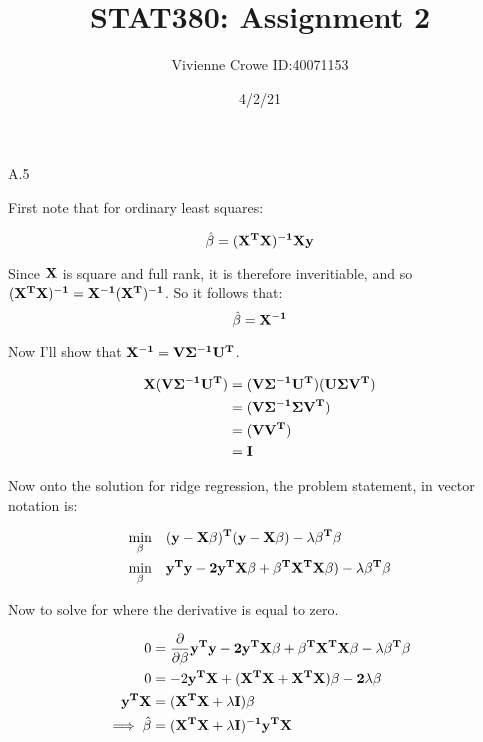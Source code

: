 \documentclass{article}
\begin{document}
    \raggedright
    \title{STAT380: Assignment 2  \\}
    \author{Vivienne Crowe ID:40071153}
    \date{4/2/21}
    
    \maketitle

    \section{}
    \subsection{}

    A.5 

    First note that for ordinary least squares:

    \[\hat{\beta} = (\bf{X}^T\bf{X})^{-1}\bf{X}\bf{y}\]

    Since $\bf{X}$ is square and full rank, it is therefore inveritiable, and so 
    $(\bf{X}^T\bf{X})^{-1} = \bf{X}^{-1} (\bf{X}^{T})^{-1}$. So it follows that:
    \[\hat{\beta} = \bf{X}^{-1}\]

    Now I'll show that $\bf{X}^{-1} = V \Sigma ^{-1}U^T$.

    \[
        \begin{aligned}
            \bf{X(V \Sigma ^{-1}U^T)} & = \bf{(V \Sigma ^{-1}U^T)}(U \Sigma V^T)\\
            & =  \bf{(V \Sigma ^{-1}}\Sigma V^T)\\
            & =  \bf{(VV^T)}\\
            & =  \bf{I}\\
        \end{aligned}
    \]

    Now onto the solution for ridge regression, the problem statement, in vector notation is:

    \[
        \begin{aligned}
            \min_\beta \quad & (\bf{y-X\beta)^T(y-X\beta}) - \lambda \beta^T\beta \\
           \min_\beta \quad & \bf{y^Ty-2y^TX\beta + \beta^T X^T X\beta}) - \lambda \beta^T\beta
        \end{aligned}
    \]
    
    Now to solve for where the derivative is equal to zero.

    \[
        \begin{aligned}
            0 & =  \frac{\partial}{\partial \beta} \bf{y^Ty-2y^TX\beta + \beta^T X^T X\beta} - \lambda \beta^T\beta \\
            0 & =  -2\bf{y^TX + (X^T X + X^T X) \beta} - 2\lambda \beta \\
            \bf{y^TX} & = \bf{(X^T X + \lambda I)\beta} \\
            \implies \hat{\beta} & = \bf{(X^T X + \lambda I)^{-1}y^TX}
        \end{aligned}
    \]

    
\end{document}
